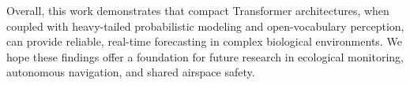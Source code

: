 \documentclass[journal]{IEEEtran}
\begin{document}
Overall, this work demonstrates that compact Transformer architectures, when coupled with heavy-tailed probabilistic modeling and open-vocabulary perception, can provide reliable, real-time forecasting in complex biological environments. We hope these findings offer a foundation for future research in ecological monitoring, autonomous navigation, and shared airspace safety.



	
	
	
	
\end{document}
